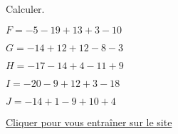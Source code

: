 \begin{exercice*}
    Calculer.
        \begin{list}{}
            \item $ F = -5-19+13+3-10 $
            \item $ G = -14+12+12-8-3 $
            \item $ H = -17-14+4-11+9 $
            \item $ I = -20-9+12+3-18 $
            \item $ J = -14+1-9+10+4 $
        \end{list}

    \href{https://coopmaths.fr/mathalea.html?ex=5R22,s=20,s2=true,n=5,i=1&v=l}{Cliquer pour vous entraîner sur le site \mathaleaLogo} 
\end{exercice*}
